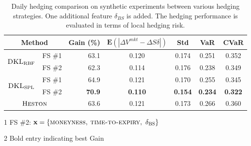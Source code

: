 \documentclass[letterpaper,12pt,titlepage,oneside,final]{book}
\numberwithin{equation}{section}
\theoremstyle{definition}
\newcommand{\vx}{\mathbf{x}}
\newcommand{\E}{\mathbf{E}}
\newcommand{\DS}{\Delta S}
\newcommand{\Heston}{\textsc{Heston}}
\newcommand{\DVmkt}{\Delta V^{mkt}}
\newcommand{\MeanAbs}{\E(|\DVmkt-\DS \delta |)}
\newcommand{\DKLs}{\bf\textsc{DKL}_{\text{SPL}}}
\newcommand{\DKLg}{\bf\textsc{DKL}_{\text{RBF}}}
\newcommand{\Del}{\delta_{\textsc{BS}}}
\begin{document}
\begin{table}[htp!]
\begin{center}
\begin{threeparttable}
\begin{tabular}{|cl| r c c c c|}
\hline
\multicolumn{2}{|c|}{Method} & Gain (\%) & $\MeanAbs$ & Std& VaR & CVaR   \\ \hline
 \multirow{2}{*}{$\DKLg$}& FS \#1 & 63.1 & 0.120 & 0.174 & 0.251 & 0.352 \\
 &FS \#2& 62.3 & 0.114 & 0.176 & 0.238 & 0.349 \\
 \multirow{2}{*}{$\DKLs$}& FS \#1 & 64.9 & 0.121 & 0.170 & 0.255 & 0.345 \\
 &FS \#2& \textbf{70.9} &\textbf{ 0.110 }& \textbf{0.154} & \textbf{0.234} & \textbf{0.322} \\
 \multicolumn{2}{|c|}{ $\Heston$ }& 63.6 & 0.121 & 0.173 & 0.266 & 0.360 \\
\hline
\end{tabular}
\caption{ Daily hedging comparison on synthetic experiments between various hedging strategies. One additional feature $\delta_{BS}$ is added. The hedging performance is evaluated in terms of local hedging risk. }
\label{DailyD}
\begin{tablenotes}
    \small
  \item[1] FS \#2:  $\vx=\{\textsc{moneyness,~time-to-expiry},~ \Del\}$
  \item[2] Bold entry indicating best Gain
  \end{tablenotes}
  \end{threeparttable}
\end{center}
\end{table}
\end{document}
